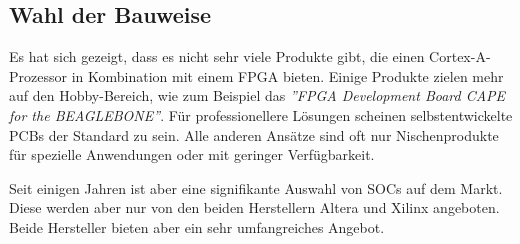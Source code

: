 %
%
%
%
%



\subsection{Wahl der Bauweise}
Es hat sich gezeigt, dass es nicht sehr viele Produkte gibt, die einen Cortex-A-Prozessor in Kombination mit einem FPGA bieten.
Einige Produkte zielen mehr auf den Hobby-Bereich, wie zum Beispiel das \textit{''FPGA Development Board CAPE for the BEAGLEBONE''}.
Für professionellere Lösungen scheinen selbstentwickelte PCBs der Standard zu sein.
Alle anderen Ansätze sind oft nur Nischenprodukte für spezielle Anwendungen oder mit geringer Verfügbarkeit.

Seit einigen Jahren ist aber eine signifikante Auswahl von SOCs auf dem Markt.
Diese werden aber nur von den beiden Herstellern Altera und Xilinx angeboten.
Beide Hersteller bieten aber ein sehr umfangreiches Angebot.

